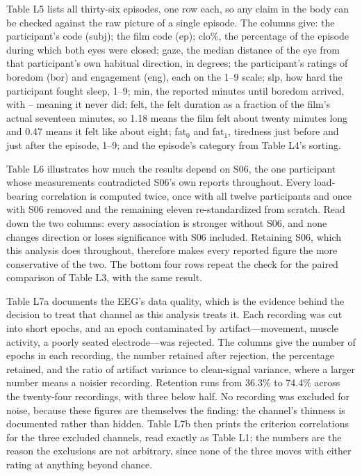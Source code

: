 Table L5 lists all thirty-six episodes, one row each, so any claim in the body can be
checked against the raw picture of a single episode. The columns give: the participant's
code (subj); the film code (ep); clo\%, the percentage of the episode during which both eyes
were closed; gaze, the median distance of the eye from that participant's own habitual
direction, in degrees; the participant's ratings of boredom (bor) and engagement (eng), each
on the 1--9 scale; slp, how hard the participant fought sleep, 1--9; min, the reported
minutes until boredom arrived, with -- meaning it never did; felt, the felt duration as a
fraction of the film's actual seventeen minutes, so 1.18 means the film felt about twenty
minutes long and 0.47 means it felt like about eight; fat$_0$ and fat$_1$, tiredness just
before and just after the episode, 1--9; and the episode's category from Table L4's sorting.

% 

Table L6 illustrates how much the results depend on S06, the one participant whose
measurements contradicted S06's own reports throughout. Every
load-bearing correlation is computed twice, once with all twelve participants and once with
S06 removed and the remaining eleven re-standardized from scratch. Read down the two
columns: every association is stronger without S06, and none changes direction or loses
significance with S06 included. Retaining S06, which this analysis does throughout,
therefore makes every reported figure the more conservative of the two. The bottom four
rows repeat the check for the paired comparison of Table L3, with the same result.

% 

Table L7a documents the EEG's data quality, which is the evidence behind the decision to
treat that channel as this analysis treats it. Each recording was cut into short epochs, and
an epoch contaminated by artifact---movement, muscle activity, a poorly seated
electrode---was rejected. The columns give the number of epochs in each recording, the
number retained after rejection, the percentage retained, and the ratio of artifact variance
to clean-signal variance, where a larger number means a noisier recording. Retention runs
from 36.3\% to 74.4\% across the twenty-four recordings, with three below half. No recording
was excluded for noise, because these figures are themselves the finding: the channel's
thinness is documented rather than hidden. Table L7b then prints the criterion correlations
for the three excluded channels, read exactly as Table L1; the numbers are the reason the
exclusions are not arbitrary, since none of the three moves with either rating at anything
beyond chance.

